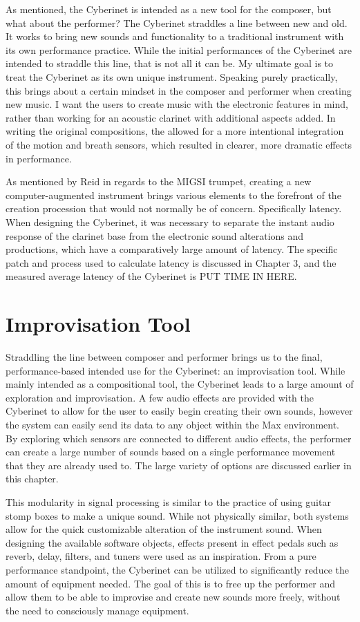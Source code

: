 As mentioned, the Cyberinet is intended as a new tool for the composer, but what about the performer? The Cyberinet straddles a line between new and old. It works to bring new sounds and functionality to a traditional instrument with its own performance practice. While the initial performances of the Cyberinet are intended to straddle this line, that is not all it can be. My ultimate goal is to treat the Cyberinet as its own unique instrument. Speaking purely practically, this brings about a certain mindset in the composer and performer when creating new music. I want the users to create music with the electronic features in mind, rather than working for an acoustic clarinet with additional aspects added. In writing the original compositions, the allowed for a more intentional integration of the motion and breath sensors, which resulted in clearer, more dramatic effects in performance.

As mentioned by Reid in regards to the MIGSI trumpet, creating a new computer-augmented instrument brings various elements to the forefront of the creation procession that would not normally be of concern. Specifically latency\cite{reid_2019}. When designing the Cyberinet, it was necessary to separate the instant audio response of the clarinet base from the electronic sound alterations and productions, which have a comparatively large amount of latency. The specific patch and process used to calculate latency is discussed in Chapter 3, and the measured average latency of the Cyberinet is PUT TIME IN HERE.

\section{Improvisation Tool}
Straddling the line between composer and performer brings us to the final, performance-based intended use for the Cyberinet: an improvisation tool. While mainly intended as a compositional tool, the Cyberinet leads to a large amount of exploration and improvisation. A few audio effects are provided with the Cyberinet to allow for the user to easily begin creating their own sounds, however the system can easily send its data to any object within the Max environment. By exploring which sensors are connected to different audio effects, the performer can create a large number of sounds based on a single performance movement that they are already used to. The large variety of options are discussed earlier in this chapter.

This modularity in signal processing is similar to the practice of using guitar stomp boxes to make a unique sound. While not physically similar, both systems allow for the quick customizable alteration of the instrument sound. When designing the available software objects, effects present in effect pedals such as reverb, delay, filters, and tuners were used as an inspiration. From a pure performance standpoint, the Cyberinet can be utilized to significantly reduce the amount of equipment needed. The goal of this is to free up the performer and allow them to be able to improvise and create new sounds more freely, without the need to consciously manage equipment.

